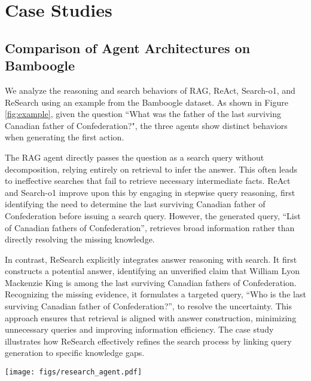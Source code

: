 \section{Case Studies} \label{sec:case_study}

\subsection{Comparison of Agent Architectures on Bamboogle}
We analyze the reasoning and search behaviors of RAG, ReAct, Search-o1, and ReSearch using an example from the Bamboogle dataset. As shown in Figure \ref{fig:example}, given the question ``What was the father of the last surviving Canadian father of Confederation?", the three agents show distinct behaviors when generating the first action.

The RAG agent directly passes the question as a search query without decomposition, relying entirely on retrieval to infer the answer. This often leads to ineffective searches that fail to retrieve necessary intermediate facts. ReAct and Search-o1 improve upon this by engaging in stepwise query reasoning, first identifying the need to determine the last surviving Canadian father of Confederation before issuing a search query. However, the generated query, ``List of Canadian fathers of Confederation'', retrieves broad information rather than directly resolving the missing knowledge.

In contrast, ReSearch explicitly integrates answer reasoning with search. It first constructs a potential answer, identifying an unverified claim that William Lyon Mackenzie King is among the last surviving Canadian fathers of Confederation. Recognizing the missing evidence, it formulates a targeted query, ``Who is the last surviving Canadian father of Confederation?'', to resolve the uncertainty. This approach ensures that retrieval is aligned with answer construction, minimizing unnecessary queries and improving information efficiency. The case study illustrates how ReSearch effectively refines the search process by linking query generation to specific knowledge gaps.

\begin{figure*}[ht!]
    \centering
    \texttt{[image: figs/research\_agent.pdf]}
    \caption{Comparison of different agent architectures in handling a multi-hop question from Bamboogle. ReSearch explicitly aligns reasoning with query generation, leading to more targeted retrieval and improved answer quality.}
    \label{fig:example}
\end{figure*}

